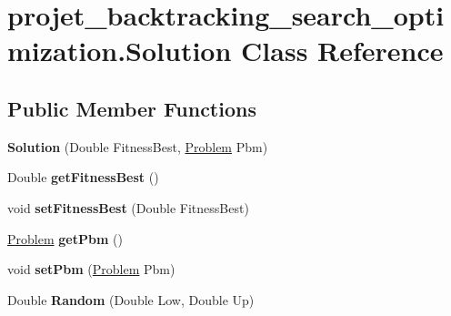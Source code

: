 \hypertarget{classprojet__backtracking__search__optimization_1_1_solution}{}\section{projet\+\_\+backtracking\+\_\+search\+\_\+optimization.\+Solution Class Reference}
\label{classprojet__backtracking__search__optimization_1_1_solution}
\subsection*{Public Member Functions}
\begin{DoxyCompactItemize}
\item 
\mbox{\label{classprojet__backtracking__search__optimization_1_1_solution_a04174ff6b0de6761c2427660757405da}} 
{\bfseries Solution} (Double Fitness\+Best, \mbox{\hyperlink{classprojet__backtracking__search__optimization_1_1_problem}{Problem}} Pbm)
\item 
\mbox{\label{classprojet__backtracking__search__optimization_1_1_solution_a78b4f6ccf582c9422b52f23d02cbd5e9}} 
Double {\bfseries get\+Fitness\+Best} ()
\item 
\mbox{\label{classprojet__backtracking__search__optimization_1_1_solution_a3520368038c602b93e84f19ad4a61771}} 
void {\bfseries set\+Fitness\+Best} (Double Fitness\+Best)
\item 
\mbox{\label{classprojet__backtracking__search__optimization_1_1_solution_a55b43a554b638c5516b1214df2bc024b}} 
\mbox{\hyperlink{classprojet__backtracking__search__optimization_1_1_problem}{Problem}} {\bfseries get\+Pbm} ()
\item 
\mbox{\label{classprojet__backtracking__search__optimization_1_1_solution_a212828694a07939106c1a427532d9a90}} 
void {\bfseries set\+Pbm} (\mbox{\hyperlink{classprojet__backtracking__search__optimization_1_1_problem}{Problem}} Pbm)
\item 
\mbox{\label{classprojet__backtracking__search__optimization_1_1_solution_a594258c4675e93301a43231751d38814}} 
Double {\bfseries Random} (Double Low, Double Up)
\end{DoxyCompactItemize}


